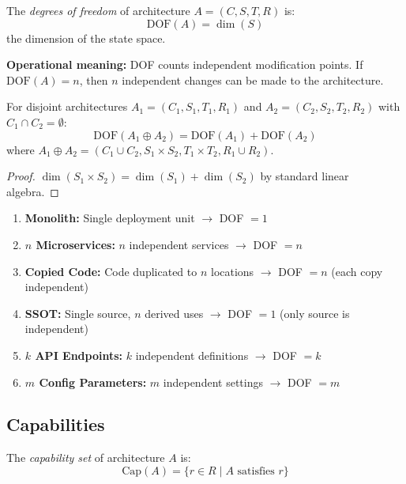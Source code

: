 \begin{definition}\label{def:dof}
The \emph{degrees of freedom} of architecture $A = (C, S, T, R)$ is:
\[
\text{DOF}(A) = \dim(S)
\]
the dimension of the state space.
\end{definition}

\textbf{Operational meaning:} DOF counts independent modification points. If $\text{DOF}(A) = n$, then $n$ independent changes can be made to the architecture.

\begin{proposition}\label{prop:dof-additive}
For disjoint architectures
$A_1 = (C_1, S_1, T_1, R_1)$ and
$A_2 = (C_2, S_2, T_2, R_2)$
with $C_1 \cap C_2 = \emptyset$:
\[
\text{DOF}(A_1 \oplus A_2) = \text{DOF}(A_1) + \text{DOF}(A_2)
\]
where $A_1 \oplus A_2 = (C_1 \cup C_2, S_1 \times S_2, T_1 \times T_2, R_1 \cup R_2)$.
\end{proposition}

\begin{proof}
$\dim(S_1 \times S_2) = \dim(S_1) + \dim(S_2)$ by standard linear algebra.
\end{proof}

\begin{example}
\begin{enumerate}
\item \textbf{Monolith:} Single deployment unit $\to$ DOF $= 1$
\item \textbf{$n$ Microservices:} $n$ independent services $\to$ DOF $= n$
\item \textbf{Copied Code:} Code duplicated to $n$ locations $\to$ DOF $= n$ (each copy independent)
\item \textbf{SSOT:} Single source, $n$ derived uses $\to$ DOF $= 1$ (only source is independent)
\item \textbf{$k$ API Endpoints:} $k$ independent definitions $\to$ DOF $= k$
\item \textbf{$m$ Config Parameters:} $m$ independent settings $\to$ DOF $= m$
\end{enumerate}
\end{example}

\subsection{Capabilities}

\begin{definition}\label{def:capabilities}
The \emph{capability set} of architecture $A$ is:
\[
\text{Cap}(A) = \{r \in R \mid A \text{ satisfies } r\}
\]
\end{definition}

